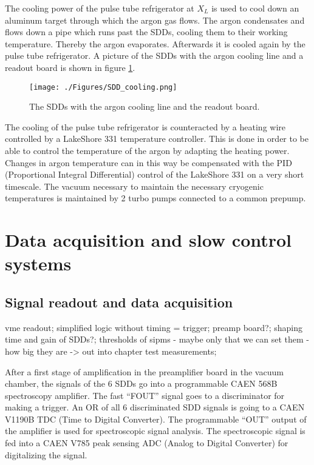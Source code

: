 The cooling power of the pulse tube refrigerator at $X_{L}$ is used to cool down an aluminum target through which the argon gas flows. The argon condensates and flows down a pipe which runs past the SDDs, cooling them to their working temperature. Thereby the argon evaporates. Afterwards it is cooled again by the pulse tube refrigerator. A picture of the SDDs with the argon cooling line and a readout board is shown in figure \ref{fig:sddcooling}.
\begin{figure}[h]
 \centering
 \texttt{[image: ./Figures/SDD\_cooling.png]}
 \caption{The SDDs with the argon cooling line and the readout board.}
 \label{fig:sddcooling}
\end{figure}

The cooling of the pulse tube refrigerator is counteracted by a heating wire controlled by a LakeShore 331 temperature controller. This is done in order to be able to control the temperature of the argon by adapting the heating power. Changes in argon temperature can in this way be compensated with the PID (Proportional Integral Differential) control of the LakeShore 331 on a very short timescale. The vacuum necessary to maintain the necessary cryogenic temperatures is maintained by 2 turbo pumps connected to a common prepump. 


\section{Data acquisition and slow control systems}
\label{sec:daqSlowControl}

\subsection{Signal readout and data acquisition}
vme readout; simplified logic without timing = trigger; 
preamp board?; shaping time and gain of SDDs?; thresholds of sipms - maybe only that we can set them - how big they are -> out into chapter test measurements; 

After a first stage of amplification in the preamplifier board in the vacuum chamber, the signals of the 6 SDDs go into a programmable CAEN 568B spectroscopy amplifier. The fast ``FOUT'' signal goes to a discriminator for making a trigger. An OR of all 6 discriminated SDD signals is going to a CAEN V1190B TDC (Time to Digital Converter). The programmable ``OUT'' output of the amplifier is used for spectroscopic signal analysis. The spectroscopic signal is fed into a CAEN V785 peak sensing ADC (Analog to Digital Converter) for digitalizing the signal.

